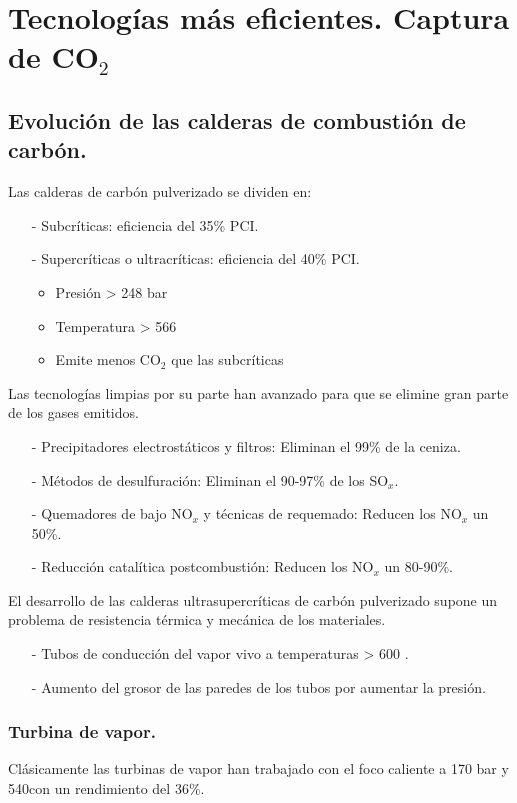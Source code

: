 \chapter{Tecnologías más eficientes. Captura de $\textbf{CO}_2$}
\section{Evolución de las calderas de combustión de carbón.}
Las calderas de carbón pulverizado se dividen en:
\begin{itemize}
	\item [-] Subcríticas: eficiencia del 35\% PCI.
	\item [-] Supercríticas o ultracríticas: eficiencia del 40\% PCI. 
	\begin{itemize}
		\item Presión > 248 bar
		\item Temperatura > 566\grado
		\item Emite menos CO$_2$ que las subcríticas
	\end{itemize}
\end{itemize}
Las tecnologías limpias por su parte han avanzado para que se elimine gran parte de los gases emitidos.
\begin{itemize}
	\item [-] Precipitadores electrostáticos y filtros: Eliminan el 99\% de la ceniza. 
	\item [-] Métodos de desulfuración: Eliminan el 90-97\% de los SO$_x$.
	\item [-] Quemadores de bajo NO$_x$ y técnicas de requemado: Reducen los NO$_x$ un 50\%.
	\item [-] Reducción catalítica postcombustión: Reducen los NO$_x$ un 80-90\%.
\end{itemize}
El desarrollo de las calderas ultrasupercríticas de carbón pulverizado supone un problema de resistencia térmica y mecánica de los materiales. 
\begin{itemize}
	\item [-] Tubos de conducción del vapor vivo a temperaturas > 600 \grado.
	\item [-] Aumento del grosor de las paredes de los tubos por aumentar la presión.
\end{itemize}
\subsection{Turbina de vapor.}
Clásicamente las turbinas de vapor han trabajado con el foco caliente a 170 bar y 540\grado con un rendimiento del 36\%.


